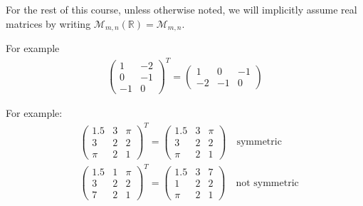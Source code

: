 \noindent For the rest of this course, unless otherwise noted, we will implicitly assume real matrices by writing $\mathcal{M}_{m,n}(\mathbb{R}) = \mathcal{M}_{m,n}$.


\noindent For example
\begin{align*}
\begin{pmatrix}
1  & -2  \\
0  & -1  \\
-1 &  0
\end{pmatrix}^T
=
\begin{pmatrix}
 1  &  0 & -1\\
-2  & -1 &  0
\end{pmatrix}
\end{align*}





\noindent For example:
\begin{align*}
&\begin{pmatrix}
1.5 & 3 & \pi \\
3   & 2 & 2 \\
\pi & 2 & 1
\end{pmatrix}^T
=
\begin{pmatrix}
1.5 & 3 & \pi \\
3   & 2 & 2 \\
\pi & 2 & 1
\end{pmatrix}
\quad \text{symmetric} \\
%
&\begin{pmatrix}
1.5 & 1 & \pi \\
3   & 2 & 2 \\
7 & 2 & 1
\end{pmatrix}^T
=
\begin{pmatrix}
1.5 & 3 & 7 \\
1   & 2 & 2 \\
\pi & 2 & 1
\end{pmatrix}
\quad \text{not symmetric}
\end{align*}

